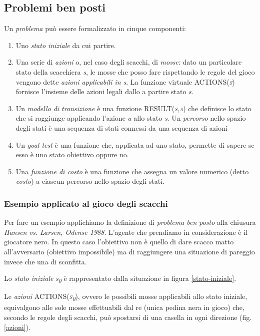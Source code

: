\subsection{Problemi ben posti}
Un \emph{problema} può essere formalizzato in cinque componenti:
\begin{enumerate}
   \item Uno \emph{stato iniziale} da cui partire.
   \item Una serie di \emph{azioni} o, nel caso degli scacchi, di \emph{mosse}: dato un particolare stato della scacchiera \emph{s}, le mosse che posso fare rispettando le regole del gioco vengono dette \emph{azioni applicabili in \emph{s}}. La funzione virtuale \textsc{ACTIONS(\emph{s})} fornisce l'insieme delle azioni legali dallo a partire stato \emph{s}.
   \item Un \emph{modello di transizione} è una funzione \textsc{RESULT(\emph{s},\emph{a})} che definisce lo stato che si raggiunge applicando l'azione \emph{a} allo stato \emph{s}.
Un \emph{percorso} nello spazio degli stati è una sequenza di stati connessi da una sequenza di azioni
   \item Un \emph{goal test} è una funzione che, applicata ad uno stato, permette di sapere se esso è uno stato obiettivo oppure no.
   \item Una \emph{funzione di costo} è una funzione che assegna un valore numerico (detto \emph{costo}) a ciascun percorso nello spazio degli stati.
\end{enumerate}

\subsubsection*{Esempio applicato al gioco degli scacchi}
Per fare un esempio applichiamo la definizione di \emph{problema ben posto} alla chiusura \emph{Hansen vs. Larsen, Odense 1988}.
L'agente che prendiamo in considerazione è il giocatore nero.
In questo caso l'obiettivo non è quello di dare scacco matto all'avversario (obiettivo impossibile) ma di raggiungere una situazione di pareggio invece che una di sconfitta.

Lo \emph{stato iniziale} \emph{s\textsubscript{0}} è rappresentato dalla situazione in figura \ref{stato-iniziale}.

Le \emph{azioni} \textsc{ACTIONS(\emph{s\textsubscript{0}})}, ovvero le possibili mosse applicabili allo stato iniziale, equivalgono alle sole mosse effettuabili dal re (unica pedina nera in gioco) che, secondo le regole degli scacchi, può spostarsi di una casella in ogni direzione (fig. \ref{azioni}).

